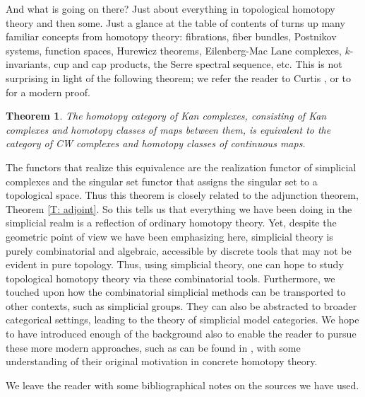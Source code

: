 \documentclass[12pt]{article}
\theoremstyle{plain}
\newtheorem{theorem}{Theorem}[section]
\theoremstyle{definition}
\theoremstyle{remark}
\begin{document}
And what is going on there? Just about everything in topological homotopy theory and then some. Just a glance at the table of contents of \cite{MAY67} turns up many familiar concepts from homotopy theory: fibrations, fiber bundles, Postnikov systems, function spaces, Hurewicz theorems, Eilenberg-Mac Lane complexes, $k$-invariants, cup and cap products, the Serre spectral sequence, etc. This is not surprising in light of the following theorem; we refer the reader to Curtis \cite[Section 12]{Cu71}, or to \cite[Section I.11]{GoeJar} for a modern proof.

\begin{theorem}\label{T: equiv}
The homotopy category of Kan complexes, consisting of Kan complexes and homotopy classes of maps between them, is equivalent to the category of CW complexes and homotopy classes of continuous maps.
\end{theorem}

The functors that realize this equivalence are the realization functor of simplicial complexes and the singular set functor that assigns the singular set to a topological space. Thus this theorem is closely related to the adjunction theorem, Theorem \ref{T: adjoint}. So this tells us that everything we have been doing in the simplicial realm is a reflection of ordinary homotopy theory. Yet, despite the geometric point of view we have been emphasizing here, simplicial theory is purely combinatorial and algebraic, accessible by discrete tools that may not be evident in pure topology. Thus, using simplicial theory, one can hope to study topological homotopy theory via these combinatorial tools. Furthermore, we touched upon how the combinatorial simplicial methods can be transported to other contexts, such as simplicial groups. They can also be abstracted to broader categorical settings, leading to the theory of simplicial model categories. We hope to have introduced enough of the background also to enable the reader to pursue these more modern approaches, such as can be found in \cite{GoeJar}, with some understanding of their original motivation in concrete homotopy theory. 


We leave the reader with some bibliographical notes on the sources we have used. 
\end{document}
